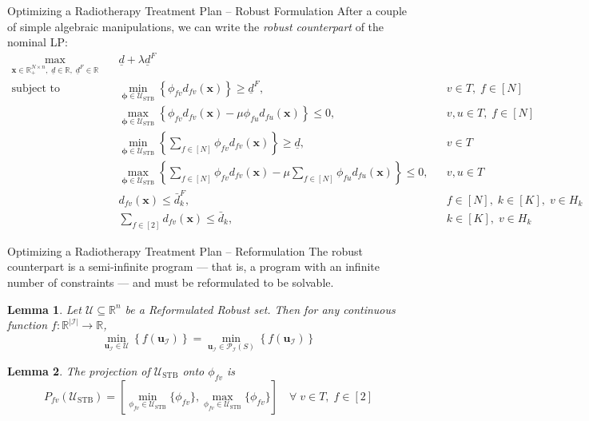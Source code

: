 \documentclass[11pt]{beamer}
\newcommand{\stb}{\mathcal{U}_{\text{STB}}}
\newtheorem{customlemma}{Lemma}
\begin{document}
\begin{frame}{Optimizing a Radiotherapy Treatment Plan – Robust Formulation}
    After a couple of simple algebraic manipulations, we can write the \textit{robust counterpart} of the nominal LP:
    \tiny{
    \begin{align}
        \max_{\mathbf{x} \in \mathbb{R}_+^{N \times n},\; \underline{d} \in \mathbb{R},\; \underline{d}^F \in \mathbb{R}} \quad 
        & \underline{d} + \lambda \underline{d}^F \tag{2.a} \\
        \text{subject to} \quad 
        & \min_{\bm{\phi} \in \stb} \left\{ \phi_{fv} d_{fv}(\mathbf{x}) \right\} \ge \underline{d}^F, && v \in T,\; f \in [N] \tag{2.b} \label{2.b} \\
        & \max_{\bm{\phi} \in \stb} \left\{ \phi_{fv} d_{fv}(\mathbf{x}) - \mu \phi_{fu} d_{fu}(\mathbf{x}) \right\} \le 0, && v,u \in T,\; f \in [N] \tag{2.c} \label{2.c} \\
        & \min_{\bm{\phi} \in \stb} \left\{ \sum_{f \in [N]} \phi_{fv} d_{fv}(\mathbf{x}) \right\} \ge \underline{d}, && v \in T \tag{2.d} \label{2.d} \\
        & \max_{\bm{\phi} \in \stb} \left\{ \sum_{f \in [N]} \phi_{fv} d_{fv}(\mathbf{x}) - \mu \sum_{f \in [N]} \phi_{fu} d_{fu}(\mathbf{x}) \right\} \le 0, && v,u \in T \tag{2.e} \label{2.e} \\
        & d_{fv}(\mathbf{x}) \le \bar{d}_k^F, && f \in [N],\; k \in [K],\; v \in H_k \tag{2.f} \\
        & \sum_{f \in [2]} d_{fv}(\mathbf{x}) \le \bar{d}_k, && k \in [K],\; v \in H_k \tag{2.g} \label{2.g}
    \end{align}}
\end{frame}

\begin{frame}{Optimizing a Radiotherapy Treatment Plan – Reformulation}
    The robust counterpart is a semi-infinite program — that is, a program with an infinite number of constraints — and must be reformulated to be solvable.
    \small{
    \begin{customlemma}
    Let $\mathcal{U} \subseteq \mathbb{R}^n$ be a Reformulated Robust set. Then for any continuous function $f: \mathbb{R}^{|\mathcal{I}|} \to \mathbb{R}$,
    \[
        \min_{\mathbf{u}_{\mathcal{I}} \in \mathcal{U}} \left\{ f(\mathbf{u}_{\mathcal{I}}) \right\}
        =
        \min_{\mathbf{u}_{\mathcal{I}} \in \mathcal{P}_{\mathcal{I}}(S)} \left\{ f(\mathbf{u}_{\mathcal{I}}) \right\}
    \]
    \end{customlemma}
    \begin{customlemma}
        The projection of $\stb$ onto $\phi_{fv}$ is 
        \[
        P_{{fv}}(\stb) = \left[\min_{\phi_{fv} \in \stb}\{\phi_{fv}\}, \max_{\phi_{fv} \in \stb}\{\phi_{fv}\}\right]
        \quad \forall\; v \in T,\; f \in [2]
        \]
        \end{customlemma}
    }
    \end{frame}
\end{document}
